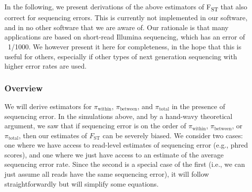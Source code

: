 \documentclass[letterpaper,fontsize=9pt,DIV=12]{scrartcl}
\newcounter{todo}
\newcommand\todo[1]{}
\newcommand{\fst}{F\textsubscript{ST}}
\newcommand*{\piw}{$\pi_\text{within}$\xspace}
\newcommand*{\pib}{$\pi_\text{between}$\xspace}
\newcommand*{\pit}{$\pi_\text{total}$\xspace}
\begin{document}
In the following, we present derivations of the above estimators of \fst{} that also correct for sequencing errors. This is currently not implemented in our software, and in no other software that we are aware of. Our rationale is that many applications are based on short-read Illumina sequencing, which has an error of ~1/1000. We however present it here for completeness, in the hope that this is useful for others, especially if other types of next generation sequencing with higher error rates are used.

\todo{check whether this or something similar is implemented in poolfstat! it might be important to mention this here then!}

\todo{Jeff, do you think it would be worth showing the above bias plots here again, with the seq error correction? it might mean that we have to implement the equations though... not sure if needed now. JPS: I think that sequencing error rates are high enough and pi tends to be low enough that they could actually mess up Fst estimates in practice.  People would probably appreciate a corrected estimate of Fst, but it's also probably not super crucial.  I guess it depends on how hard it is to implement. LC: it's kind of a lot to implement... instead of just keeping counts or frequencies at each position, we'd have to keep track of each base with its respective quality score throughout the whole process... a lot of code refactoring! the average one could be done more easily though, I think.}


\subsubsection*{Overview}
\label{supp:sec:FST:sub:HeterozygositySequencingError:sub:Overview}

We will derive estimators for \piw, \pib, and \pit in the presence of sequencing error.  In the simulations above, and by a hand-wavy theoretical argument, we saw that if sequencing error is on the order of \piw, \pib, or \pit, then our estimates of $F_\text{ST}$ can be severely biased.  We consider two cases: one where we have access to read-level estimates of sequencing error (e.g., phred scores), and one where we just have access to an estimate of the average sequencing error rate.  Since the second is a special case of the first (i.e., we can just assume all reads have the same sequencing error), it will follow straightforwardly but will simplify some equations.
\end{document}

